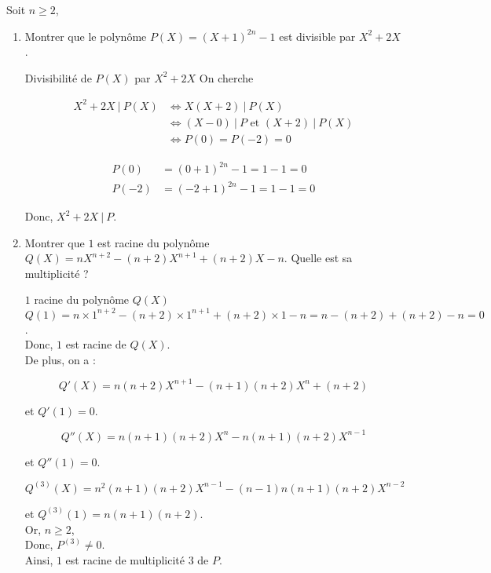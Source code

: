 \noindent Soit $n \geq 2$,

\begin{enumerate}
    \item Montrer que le polynôme $P(X) = (X + 1)^{2n} - 1$ est divisible par $X^2 + 2X$.

    \begin{theorem}[black]{Divisibilité de $P(X)$ par $X^2 + 2X$}
        On cherche

        \begin{align*}
            X^2 + 2X \ | \ P(X) &\Longleftrightarrow X(X + 2) \ | \ P(X) \\
            &\Longleftrightarrow (X - 0) \ | \ P \text{ et } (X + 2) \ | \ P(X) \\
            &\Longleftrightarrow P(0) = P(-2) = 0
        \end{align*}

        \begin{align*}
            P(0) &= (0 + 1)^{2n} - 1 = 1 - 1 = 0 \\
            P(-2) &= (-2 + 1)^{2n} - 1 = 1 - 1 = 0
        \end{align*}

        Donc, $X^2 + 2X \ | \ P$.
    \end{theorem}
    
    \item Montrer que $1$ est racine du polynôme $Q(X) = nX^{n + 2} - (n + 2)X^{n + 1} + (n + 2)X - n$. Quelle est sa multiplicité ?

    \begin{theorem}[black]{$1$ racine du polynôme $Q(X)$}
        $Q(1) = n \times 1^{n + 2} - (n + 2) \times 1^{n + 1} + (n + 2) \times 1 - n = n - (n + 2) + (n + 2) - n = 0$. \\
        Donc, $1$ est racine de $Q(X)$. \\

        \noindent De plus, on a :

        $$
            Q'(X) = n(n + 2)X^{n + 1} - (n + 1)(n + 2)X^n + (n + 2)
        $$

        \noindent et $Q'(1) = 0$.

        $$
            Q''(X) = n(n + 1)(n + 2)X^n - n(n + 1)(n + 2)X^{n - 1}
        $$

        \noindent et $Q''(1) = 0$.

        $$
            Q^{(3)}(X) = n^2(n + 1)(n + 2)X^{n - 1} - (n - 1)n(n + 1)(n + 2)X^{n - 2}
        $$

        \noindent et $Q^{(3)}(1) = n(n + 1)(n + 2)$. \\
        Or, $n \geq 2$, \\
        Donc, $P^{(3)} \neq 0$. \\

        \noindent Ainsi, $1$ est racine de multiplicité $3$ de $P$.
        
    \end{theorem}
    
\end{enumerate}
